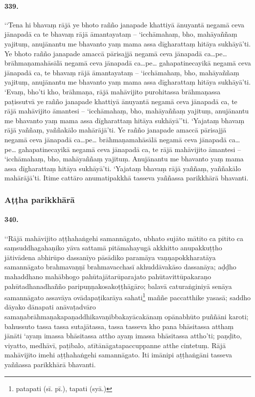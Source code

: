 \paragraph{339.} ‘‘Tena hi bhavaṃ rājā ye bhoto rañño janapade khattiyā ānuyantā negamā ceva jānapadā ca te bhavaṃ rājā āmantayataṃ – ‘icchāmahaṃ, bho, mahāyaññaṃ yajituṃ, anujānantu me bhavanto yaṃ mama assa dīgharattaṃ hitāya sukhāyā’ti. Ye bhoto rañño janapade amaccā pārisajjā negamā ceva jānapadā ca…pe… brāhmaṇamahāsālā negamā ceva jānapadā ca…pe… gahapatinecayikā negamā ceva jānapadā ca, te bhavaṃ rājā āmantayataṃ – ‘icchāmahaṃ, bho, mahāyaññaṃ yajituṃ, anujānantu me bhavanto yaṃ mama assa dīgharattaṃ hitāya sukhāyā’ti. ‘Evaṃ, bho’ti kho, brāhmaṇa, rājā mahāvijito purohitassa brāhmaṇassa paṭissutvā ye rañño janapade khattiyā ānuyantā negamā ceva jānapadā ca, te rājā mahāvijito āmantesi – ‘icchāmahaṃ, bho, mahāyaññaṃ yajituṃ, anujānantu me bhavanto yaṃ mama assa dīgharattaṃ hitāya sukhāyā’’ti. ‘Yajataṃ bhavaṃ rājā yaññaṃ, yaññakālo mahārājā’ti. Ye rañño janapade amaccā pārisajjā negamā ceva jānapadā ca…pe… brāhmaṇamahāsālā negamā ceva jānapadā ca…pe… gahapatinecayikā negamā ceva jānapadā ca, te rājā mahāvijito āmantesi – ‘icchāmahaṃ, bho, mahāyaññaṃ yajituṃ. Anujānantu me bhavanto yaṃ mama assa dīgharattaṃ hitāya sukhāyā’ti. ‘Yajataṃ bhavaṃ rājā yaññaṃ, yaññakālo mahārājā’ti. Itime cattāro anumatipakkhā tasseva yaññassa parikkhārā bhavanti.

\subsubsection{Aṭṭha parikkhārā}

\paragraph{340.} ‘‘Rājā mahāvijito aṭṭhahaṅgehi samannāgato, ubhato sujāto mātito ca pitito ca saṃsuddhagahaṇiko yāva sattamā pitāmahayugā akkhitto anupakkuṭṭho jātivādena abhirūpo dassanīyo pāsādiko paramāya vaṇṇapokkharatāya samannāgato brahmavaṇṇī brahmavacchasī akhuddāvakāso dassanāya; aḍḍho mahaddhano mahābhogo pahūtajātarūparajato pahūtavittūpakaraṇo pahūtadhanadhañño paripuṇṇakosakoṭṭhāgāro; balavā caturaṅginiyā senāya samannāgato assavāya ovādapaṭikarāya sahati\footnote{patapati (sī. pī.), tapati (syā.)} maññe paccatthike yasasā; saddho dāyako dānapati anāvaṭadvāro samaṇabrāhmaṇakapaṇaddhikavaṇibbakayācakānaṃ opānabhūto puññāni karoti; bahussuto tassa tassa sutajātassa, tassa tasseva kho pana bhāsitassa atthaṃ jānāti ‘ayaṃ imassa bhāsitassa attho ayaṃ imassa bhāsitassa attho’ti; paṇḍito, viyatto, medhāvī, paṭibalo, atītānāgatapaccuppanne atthe cintetuṃ. Rājā mahāvijito imehi aṭṭhahaṅgehi samannāgato. Iti imānipi aṭṭhaṅgāni tasseva yaññassa parikkhārā bhavanti.

